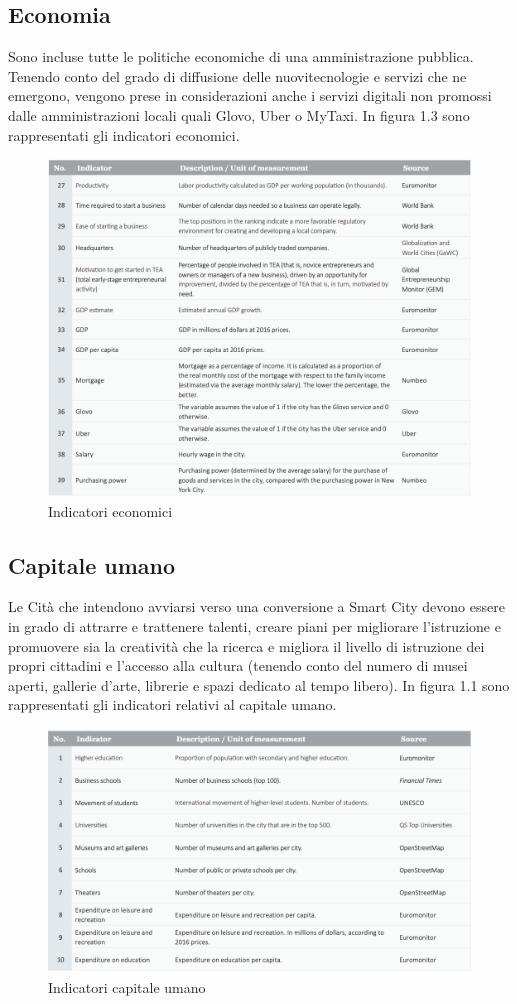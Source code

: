 \subsection{Economia}
Sono incluse tutte le politiche economiche di una amministrazione pubblica. Tenendo conto del grado di diffusione delle nuovitecnologie e servizi che ne emergono, vengono prese in considerazioni anche i servizi digitali non promossi dalle amministrazioni locali quali Glovo, Uber o MyTaxi.
In figura 1.3 sono rappresentati gli indicatori economici.
\begin{figure}[h!]
	\begin{center}
		\includegraphics[width=320bp]{img/indicatori_economici.png}
		\caption{Indicatori economici}
	\end{center}
\end{figure}

\subsection{Capitale umano}
Le Cità che intendono avviarsi verso una conversione a Smart City devono essere in grado di attrarre e trattenere talenti, creare piani per migliorare l'istruzione e promuovere sia la creatività che la ricerca e migliora il livello di istruzione dei propri cittadini e l'accesso alla cultura (tenendo conto del numero di musei aperti, gallerie d'arte, librerie e spazi dedicato al tempo libero).
In figura 1.1 sono rappresentati gli indicatori relativi al capitale umano.
\begin{figure}[ht]
	\begin{center}
		\includegraphics[width=320bp]{img/indicatori_capitale_umano.png}
		\caption{Indicatori capitale umano}
	\end{center}
\end{figure}

